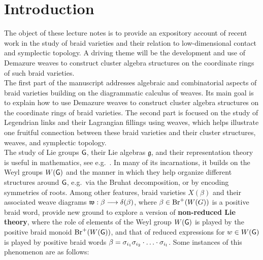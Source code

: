 \section*{Introduction}\label{sec:intro}

The object of these lecture notes is to provide an expository account of recent work in the study of braid varieties and their relation to low-dimensional contact and symplectic topology. A driving theme will be the development and use of Demazure weaves to construct cluster algebra structures on the coordinate rings of such braid varieties.\\

\noindent The first part of the manuscript addresses algebraic and combinatorial aspects of braid varieties building on the diagrammatic calculus of weaves. Its main goal is to explain how to use Demazure weaves to construct cluster algebra structures on the coordinate rings of braid varieties. The second part is focused on the study of Legendrian links and their Lagrangian fillings using weaves, which helps illustrate one fruitful connection between these braid varieties and their cluster structures, weaves, and symplectic topology.\\


 The study of Lie groups $\mathsf{G}$, their Lie algebras $\mathfrak{g}$, and their representation theory is useful in mathematics, see e.g.~\cite{MR1920389,MR2069175,MR2440737,MR3331229,MR1240056,MR1345386,MR3443860}. In many of its incarnations, it builds on the Weyl groups $W(\mathsf{G})$ and the manner in which they help organize different structures around $\mathsf{G}$, e.g.~via the Bruhat decomposition, or by encoding symmetries of roots. Among other features, braid varieties $X(\beta)$ and their associated weave diagrams $\mathfrak{w}:\beta\longrightarrow\delta(\beta)$, where $\beta\in\text{Br}^+(W(G))$ is a positive braid word, provide new ground to explore a version of {\bf non-reduced Lie theory}, where the role of elements of the Weyl group $W(\mathsf{G})$ is played by the positive braid monoid $\text{Br}^+(W(\mathsf{G}))$, and that of reduced expressions for $w\in W(\mathsf{G})$ is played by positive braid words $\beta=\sigma_{i_1}\sigma_{i_2}\cdot\ldots\cdot\sigma_{i_l}$. Some instances of this phenomenon are as follows:\\

